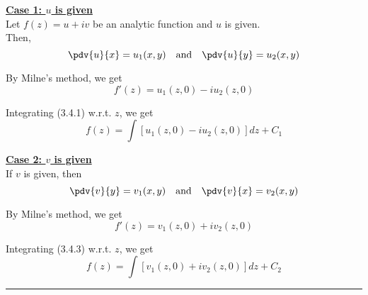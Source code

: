 \underline{\textbf{Case 1: $u$ is given}} \\
Let $f(z) = u + iv$ be an analytic function and $u$ is given. \\
Then, \[
    \pdv{u}{x} = u_1(x,y) \quad \text{and} \quad \pdv{u}{y} = u_2(x,y)
\] 

By Milne's method, we get
\begin{equation}
    f'(z) = u_1(z,0) - iu_2(z,0)
\end{equation} 

Integrating (3.4.1) w.r.t. $z$, we get
\begin{equation}
    f(z) = \int \left[ u_1(z,0) - iu_2(z,0) \right] dz + C_1
\end{equation}

\underline{\textbf{Case 2: $v$ is given}} \\
If $v$ is given, then \[
    \pdv{v}{y} = v_1(x,y) \quad \text{and} \quad \pdv{v}{x} = v_2(x,y)
\] 

By Milne's method, we get
\begin{equation}
    f'(z) = v_1(z,0) + iv_2(z,0)
\end{equation}

Integrating (3.4.3) w.r.t. $z$, we get
\begin{equation}
    f(z) = \int \left[ v_1(z,0) + iv_2(z,0) \right] dz + C_2
\end{equation}

\vspace{20pt}\rule{3in}{1pt}
